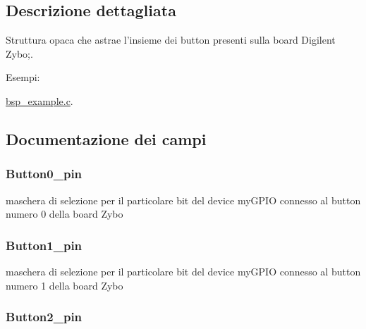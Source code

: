 \subsection{Descrizione dettagliata}
Struttura opaca che astrae l'insieme dei button presenti sulla board Digilent Zybo;. \begin{Desc}
\item[Esempi\+: ]\par
\hyperlink{bsp_example_8c-example}{bsp\+\_\+example.\+c}.\end{Desc}


\subsection{Documentazione dei campi}
\hypertarget{struct_zybo_button__t_af7d7d5a9c9fc174e8f4ee4c762c2abee}{
\subsubsection[{Button0\+\_\+pin}]{ Button0\+\_\+pin}}\label{struct_zybo_button__t_af7d7d5a9c9fc174e8f4ee4c762c2abee}
maschera di selezione per il particolare bit del device my\+G\+P\+I\+O connesso al button numero 0 della board Zybo \hypertarget{struct_zybo_button__t_a6cb60bb285e32e29c51c15e85206aaeb}{
\subsubsection[{Button1\+\_\+pin}]{ Button1\+\_\+pin}}\label{struct_zybo_button__t_a6cb60bb285e32e29c51c15e85206aaeb}
maschera di selezione per il particolare bit del device my\+G\+P\+I\+O connesso al button numero 1 della board Zybo \hypertarget{struct_zybo_button__t_a3b4fe634c2d98ce55fdef526c2d230d1}{
\subsubsection[{Button2\+\_\+pin}]{ Button2\+\_\+pin}}\label{struct_zybo_button__t_a3b4fe634c2d98ce55fdef526c2d230d1}

